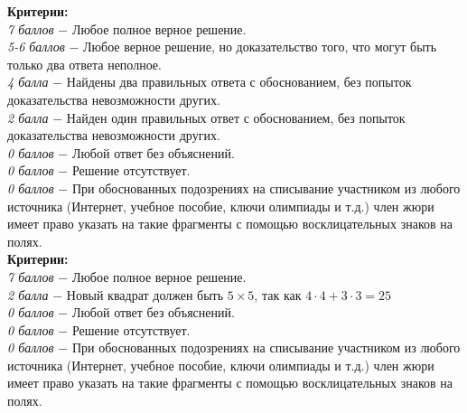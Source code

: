  \textbf{Критерии:} \\
\textit{7 баллов} $-$ Любое полное верное решение.\\
\textit{5-6 баллов} $-$ Любое верное решение, но доказательство того, что могут быть только два ответа неполное.\\
\textit{4 балла} $-$ Найдены два правильных ответа с обоснованием, без попыток доказательства невозможности других.\\
\textit{2 балла} $-$ Найден один правильных ответ с обоснованием, без попыток доказательства невозможности других.\\
\textit{0 баллов} $-$ Любой ответ без объяснений.\\
\textit{0 баллов} $-$ Решение отсутствует.\\
\textit{0 баллов} $-$ При обоснованных подозрениях на списывание участником из любого источника (Интернет, учебное пособие, ключи олимпиады и т.д.) член жюри имеет право указать на такие фрагменты с помощью восклицательных знаков на полях. \\

 \textbf{Критерии:} \\
\textit{7 баллов} $-$ Любое полное верное решение.\\
\textit{2 балла} $-$ Новый квадрат должен быть $5\times5$, так как $4\cdot4+3\cdot3=25$\\
\textit{0 баллов} $-$ Любой ответ без объяснений.\\
\textit{0 баллов} $-$ Решение отсутствует.\\
\textit{0 баллов} $-$ При обоснованных подозрениях на списывание участником из любого источника (Интернет, учебное пособие, ключи олимпиады и т.д.) член жюри имеет право указать на такие фрагменты с помощью восклицательных знаков на полях. \\
